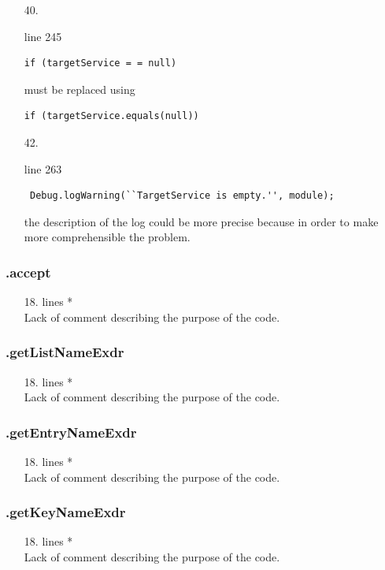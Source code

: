 \documentclass[english]{article}
\begin{document}
\begin{itemize}
	\item[40.]{ line 245 
		\begin{lstlisting}
if (targetService = = null) 
		\end{lstlisting} must be replaced using
		\begin{lstlisting}
if (targetService.equals(null))
		\end{lstlisting}}
	
	
	 \item[42.]{line 263
		\begin{lstlisting} 
 Debug.logWarning(``TargetService is empty.'', module);
		\end{lstlisting}
		the description of the log could be more precise because in order to make more comprehensible the problem.}
\end{itemize}
\subsubsection*{.accept}
\begin{itemize}
\item[18.]{lines  *\\
		Lack of comment describing the purpose of the code.}
\end{itemize}
\subsubsection*{.getListNameExdr}
\begin{itemize}
\item[18.]{lines  *\\
		Lack of comment describing the purpose of the code.}
\end{itemize}
\subsubsection*{.getEntryNameExdr}
\begin{itemize}
\item[18.]{lines  *\\
		Lack of comment describing the purpose of the code.}
\end{itemize}
\subsubsection*{.getKeyNameExdr}
\begin{itemize}
\item[18.]{lines  *\\
		Lack of comment describing the purpose of the code.}
\end{itemize}
\end{document}
